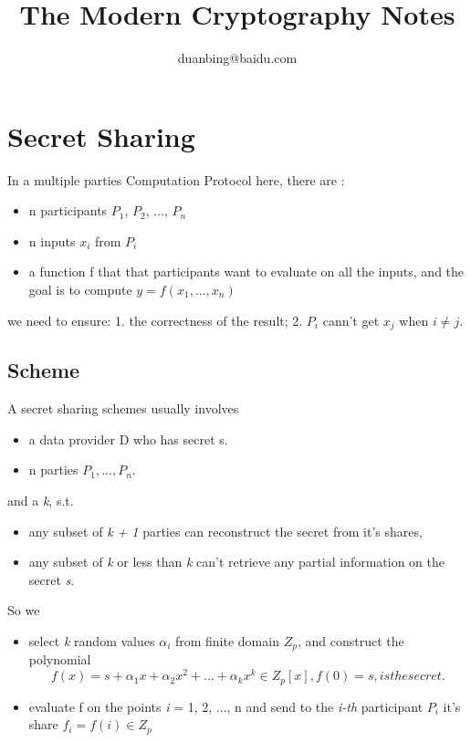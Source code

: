 \documentclass[a4paper,11pt]{article}
\author{duanbing@baidu.com}
\title{The Modern Cryptography Notes}
\begin{document}
 \maketitle 
 
  \tableofcontents


 \section{Secret Sharing}
 
 In a multiple parties Computation Protocol here, there are :

 \begin{itemize}
 \item  n participants $P_{1}$, $P_{2}$, ..., $P_{n}$
 \item  n inputs $x_i$ from ${P_i}$
 \item a function f that that participants want to evaluate on all the inputs,  and the goal is to compute  $ y = f(x_1, ..., x_n) $ 
 \end{itemize}
 
 we need to ensure: 1.  the correctness of the result; 2.  $P_i$ cann't get $x_j$ when $ i \neq j$.

\subsection{Scheme}

A secret sharing schemes usually involves 
\begin{itemize}
\item a data provider D who has secret s.
\item n parties $P_1, ... , P_n$.
\end{itemize}

and a \textit{k},  s.t.

\begin{itemize}
\item   any subset of \textit{k + 1} parties can reconstruct the secret from it's shares, 
\item  any subset of \textit{k} or less than \textit{k} can't retrieve any partial information on the secret \textit{s}.
\end{itemize}

So we  

\begin {itemize}
\item select \textit{k} random values $ \alpha_i  $  from finite domain $Z_p$, and construct the polynomial 
\begin{displaymath}
f(x) = s + \alpha_{1}x + \alpha_{2}x^{2} + ... + \alpha_{k}x^{k}   \in Z_{p}[x],  f(0) = s, is the secret.
\end{displaymath}

\item evaluate f on  the points \textit{i} = 1, 2, ..., n and send to the \textit{i-th} participant $P_i$ it's share $f_i = f(i) \in Z_p$ 

\end{itemize}
\end{document}
